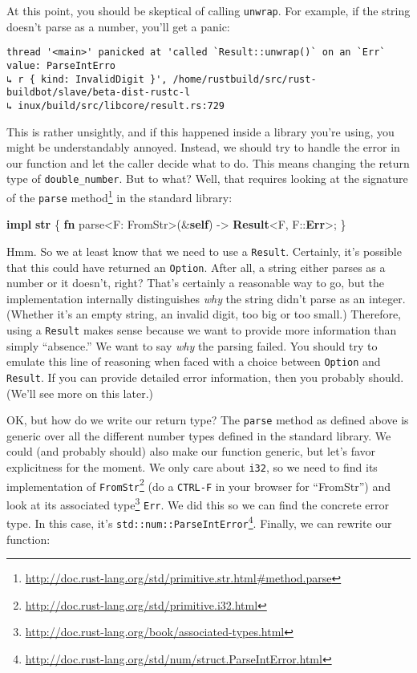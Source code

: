 \documentclass[a4paper,]{book}
\newenvironment{Shaded}{\begin{snugshade}}{\end{snugshade}}
\newcommand{\KeywordTok}[1]{\textcolor[rgb]{0.13,0.29,0.53}{\textbf{{#1}}}}
\newcommand{\NormalTok}[1]{{#1}}
\renewcommand{\href}[2]{#2\footnote{\url{#1}}}
\begin{document}
At this point, you should be skeptical of calling \texttt{unwrap}. For
example, if the string doesn't parse as a number, you'll get a panic:

\begin{verbatim}
thread '<main>' panicked at 'called `Result::unwrap()` on an `Err` value: ParseIntErro
↳ r { kind: InvalidDigit }', /home/rustbuild/src/rust-buildbot/slave/beta-dist-rustc-l
↳ inux/build/src/libcore/result.rs:729
\end{verbatim}

This is rather unsightly, and if this happened inside a library you're
using, you might be understandably annoyed. Instead, we should try to
handle the error in our function and let the caller decide what to do.
This means changing the return type of \texttt{double\_number}. But to
what? Well, that requires looking at the signature of the
\href{http://doc.rust-lang.org/std/primitive.str.html\#method.parse}{\texttt{parse}
method} in the standard library:

\begin{Shaded}
\begin{Highlighting}[]
\KeywordTok{impl} \KeywordTok{str} \NormalTok{\{}
    \KeywordTok{fn} \NormalTok{parse<F: FromStr>(&}\KeywordTok{self}\NormalTok{) -> }\KeywordTok{Result}\NormalTok{<F, F::}\KeywordTok{Err}\NormalTok{>;}
\NormalTok{\}}
\end{Highlighting}
\end{Shaded}

Hmm. So we at least know that we need to use a \texttt{Result}.
Certainly, it's possible that this could have returned an
\texttt{Option}. After all, a string either parses as a number or it
doesn't, right? That's certainly a reasonable way to go, but the
implementation internally distinguishes \emph{why} the string didn't
parse as an integer. (Whether it's an empty string, an invalid digit,
too big or too small.) Therefore, using a \texttt{Result} makes sense
because we want to provide more information than simply ``absence.'' We
want to say \emph{why} the parsing failed. You should try to emulate
this line of reasoning when faced with a choice between \texttt{Option}
and \texttt{Result}. If you can provide detailed error information, then
you probably should. (We'll see more on this later.)

OK, but how do we write our return type? The \texttt{parse} method as
defined above is generic over all the different number types defined in
the standard library. We could (and probably should) also make our
function generic, but let's favor explicitness for the moment. We only
care about \texttt{i32}, so we need to
\href{http://doc.rust-lang.org/std/primitive.i32.html}{find its
implementation of \texttt{FromStr}} (do a \texttt{CTRL-F} in your
browser for ``FromStr'') and look at its
\href{http://doc.rust-lang.org/book/associated-types.html}{associated
type} \texttt{Err}. We did this so we can find the concrete error type.
In this case, it's
\href{http://doc.rust-lang.org/std/num/struct.ParseIntError.html}{\texttt{std::num::ParseIntError}}.
Finally, we can rewrite our function:
\end{document}
